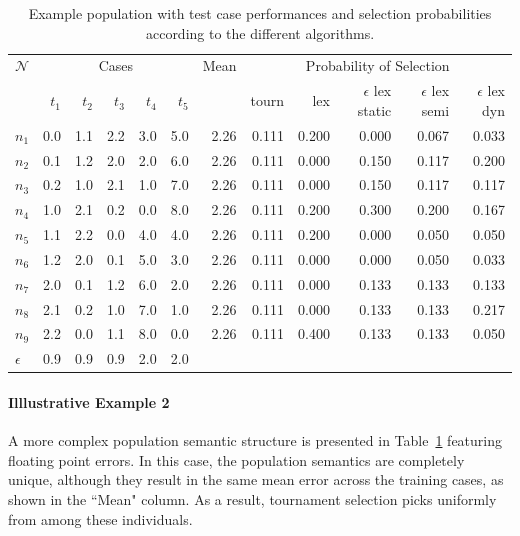 \documentclass[preprint]{article}
\begin{document}
\begin{table}
\centering
\scriptsize
\caption{Example population with test case performances and selection probabilities according to the different algorithms.}\label{tbl:ex2}
\begin{tabularx}{\textwidth}{X|rrrrr|r|rrrrr}\toprule
$\mathcal{N}$ & \multicolumn{5}{c}{Cases} & Mean & \multicolumn{5}{c}{Probability of Selection} \\
& $t_1$ & $t_2$ & $t_3$ & $t_4$ & $t_5$ &&	tourn	&	lex	&	$\epsilon$ lex static	&	$\epsilon$ lex semi	&	$\epsilon$ lex dyn\\ \midrule
$n_1$	&0.0	&	1.1	&	2.2	&	3.0	&	5.0 & 2.26	&	0.111	&	0.200	&	0.000	&	0.067	&	0.033\\ 
$n_2$	&0.1	&	1.2	&	2.0	&	2.0	&	6.0 & 2.26	&	0.111	&	0.000	&	0.150	&	0.117	&	0.200\\ 
$n_3$	&0.2	&	1.0	&	2.1	&	1.0	&	7.0 & 2.26	&	0.111	&	0.000	&	0.150	&	0.117	&	0.117\\ 
$n_4$	&1.0	&	2.1	&	0.2	&	0.0	&	8.0 & 2.26	&	0.111	&	0.200	&	0.300	&	0.200	&	0.167\\ 
$n_5$	&1.1	&	2.2	&	0.0	&	4.0	&	4.0 & 2.26	&	0.111	&	0.200	&	0.000	&	0.050	&	0.050\\ 
$n_6$	&1.2	&	2.0	&	0.1	&	5.0	&	3.0 & 2.26	&	0.111	&	0.000	&	0.000	&	0.050	&	0.033\\ 
$n_7$	&2.0	&	0.1	&	1.2	&	6.0	&	2.0 & 2.26	&	0.111	&	0.000	&	0.133	&	0.133	&	0.133\\ 
$n_8$	&2.1	&	0.2	&	1.0	&	7.0	&	1.0 & 2.26	&	0.111	&	0.000	&	0.133	&	0.133	&	0.217\\ 
$n_9$	&2.2	&	0.0	&	1.1	&	8.0	&	0.0 & 2.26	&	0.111	&	0.400	&	0.133	&	0.133	&	0.050\\  \midrule
$\epsilon$	&	0.9	& 0.9	&	0.9	&	2.0	& 2.0	&&&&&&\\ \bottomrule
\end{tabularx}
\end{table}

\paragraph{Illlustrative Example 2} A more complex population semantic structure is presented in Table~\ref{tbl:ex2} featuring floating point errors. In this case, the population semantics are completely unique, although they result in the same mean error across the training cases, as shown in the ``Mean" column. As a result, tournament selection picks uniformly from among these individuals. 
\end{document}
